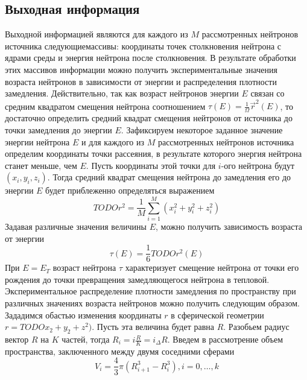 \documentclass[a4paper]{article}
\begin{document}
    \subsection{Выходная информация}
    Выходной информацией являются для каждого из $M$
    рассмотренных нейтронов источника следующиемассивы: координаты
    точек столкновения нейтрона с ядрами среды и энергия нейтрона
    после столкновения. В результате обработки этих массивов
    информации можно получить экспериментальные значения возраста
    нейтронов в зависимости от энергии и распределения плотности
    замедления. Действительно, так как возраст нейтронов энергии
    $E$ связан со средним квадратом смещения нейтрона соотношением
    \(\tau(E)=\frac{1}{\Omega}\vec{r}^2(E)\), то достаточно
    определить средний квадрат смещения нейтронов от источника до
    точки замедления до энергии $E$. Зафиксируем некоторое заданное
    значение энергии нейтрона $E$ и для каждого из $M$ рассмотренных
    нейтронов источника определим координаты точки рассеяния, в
    результате которого энергия нейтрона станет меньше, чем $E$.
    Пусть координаты этой точки для $i$-ого нейтрона будут
    $(x_i, y_i, z_i)$. Тогда средний квадрат смещения нейтрона до
    замедления его до энергии $E$ будет приблеженно определяться
    выражением
    \begin{equation}\nonumber
        TODO{r}^2 = \frac{1}{M}\sum_{i=1}^{M}
        (x_i^2 + y_i^2 + z_i^2)
    \end{equation}
    Задавая различные значения величины $E$, можно получить
    зависимость возраста от энергии
    \begin{equation}\nonumber
        \tau(E)=\frac{1}{6}TODO{r}^2(E)
    \end{equation}
    При $E=E_T$ возраст нейтрона $\tau$ характеризует смещение
    нейтрона от точки его рождения до точки превращения замедляющегося
    нейтрона в тепловой.
    \newline
    Экспериментальное распределение плотности замедления по
    пространству при различных значениях возраста нейтронов можно
    получить следующим образом. Зададимся обастью изменения
    координаты $r$ в сферической геометрии
    \(r = TODO{x_2 + y_2 + z^2)}\). Пусть эта величина будет равна
    $R$. Разобьем радиус вектор $R$ на $K$ частей, тогда
    \(R_i=i\frac{R}{K} = i_\Delta R\). Введем в рассмотрение объем
    пространства, заключенного между двумя соседними сферами
    \begin{equation}\nonumber
        V_i = \frac{4}{3}\pi(R_{i+1}^3 - R_i^3), i=0,\dots,k
    \end{equation}
\end{document}
